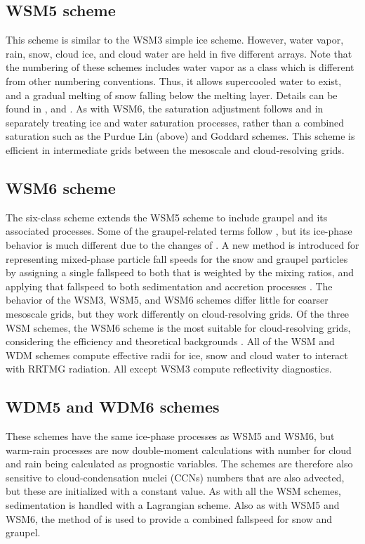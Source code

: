 \subsection{WSM5 scheme}

This scheme is similar to the WSM3 simple ice scheme. However, water vapor, rain, snow, cloud ice,
and cloud water are held in five different arrays. Note that the numbering of these schemes includes water vapor as a class which is different from other
numbering conventions. Thus, it allows supercooled water to exist, and
a gradual melting of snow falling below the melting layer. Details can be found in 
\citet{hong04}, and \citet{honglim06}. As with WSM6, the saturation adjustment follows \citet{dudhia89} and \citet{hong98} in separately treating ice and water saturation processes, rather than a combined saturation such as the Purdue Lin (above) and Goddard \citep{tao89} schemes. This scheme is efficient in intermediate grids between the mesoscale and cloud-resolving grids.

\subsection{WSM6 scheme}

The six-class scheme extends the WSM5 scheme to include graupel and its associated processes.
Some of the graupel-related terms follow \citet{lin83}, but its ice-phase behavior is much different due to the changes of \citet{hong04}. A new method is introduced for representing mixed-phase particle fall speeds for the snow and graupel particles by assigning a single fallspeed to both that is weighted by the mixing ratios, and applying that fallspeed to both sedimentation and accretion processes \citep{dudhia08}. The behavior of the WSM3, WSM5, and WSM6 schemes differ little for coarser mesoscale grids, but they work differently on cloud-resolving grids. Of the three WSM schemes, the WSM6 scheme is the most suitable for cloud-resolving grids, considering the efficiency and theoretical backgrounds \citep{honglim06}. All of the WSM and WDM schemes compute effective radii for ice, snow and cloud water to interact with RRTMG radiation. All except WSM3 compute reflectivity diagnostics.

\subsection{WDM5 and WDM6 schemes}

These schemes have the same ice-phase processes as WSM5 and WSM6, but warm-rain processes are now double-moment calculations \citep{lim10} with number for cloud and rain being calculated as prognostic variables. The schemes are therefore also sensitive to cloud-condensation nuclei (CCNs) numbers that are also advected, but these are initialized with a constant value. As with all the WSM schemes, sedimentation is handled with a Lagrangian scheme. Also as with WSM5 and WSM6, the method of \citet{dudhia08} is used
to provide a combined fallspeed for snow and graupel.

